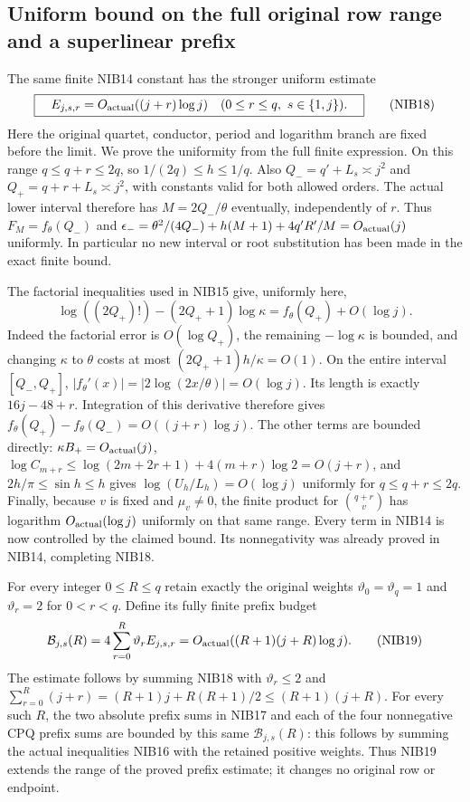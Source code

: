 \documentclass[11pt,a4paper]{article}
\begin{document}
\subsection{Uniform bound on the full original row range and a superlinear prefix}
The same finite NIB14 constant has the stronger uniform estimate
\[
 \boxed{\quad E_{j,s,r}=O_{\rm actual}((j+r)\log j)
    \quad(0\le r\le q,\ s\in\{1,j\}).\quad}               \tag{NIB18}
\]
Here the original quartet, conductor, period and logarithm branch
are fixed before the limit. We prove the uniformity from the full
finite expression. On this range $q\le q+r\le2q$, so
$1/(2q)\le h\le1/q$. Also $Q_-=q'+L_s\asymp j^2$ and
$Q_+=q+r+L_s\asymp j^2$, with constants valid for both allowed
orders. The actual lower interval therefore has
$M=2Q_-/\theta$ eventually, independently of $r$. Thus
$F_M=f_\theta(Q_-)$ and
$\epsilon_-=\theta^2/(4Q_-)+h(M+1)+4q'R'/M=O_{\rm actual}(j)$
uniformly. In particular no new interval or root substitution
has been made in the exact finite bound.

The factorial inequalities used in NIB15 give, uniformly here,
\[
 \log((2Q_+)!) -(2Q_++1)\log\kappa
       =f_\theta(Q_+)+O(\log j).
\]
Indeed the factorial error is $O(\log Q_+)$, the remaining
$-\log\kappa$ is bounded, and changing $\kappa$ to $\theta$
costs at most $(2Q_++1)h/\kappa=O(1)$. On the entire interval
$[Q_-,Q_+]$, $|f_\theta'(x)|=|2\log(2x/\theta)|=O(\log j)$.
Its length is exactly $16j-48+r$. Integration of this derivative
therefore gives
$f_\theta(Q_+)-f_\theta(Q_-)=O((j+r)\log j)$.
The other terms are bounded directly:
$\kappa B_+=O_{\rm actual}(j)$,
$\log C_{m+r}\le\log(2m+2r+1)+4(m+r)\log2=O(j+r)$,
and $2h/\pi\le\sin h\le h$ gives
$\log(U_h/L_h)=O(\log j)$ uniformly for $q\le q+r\le2q$.
Finally, because $v$ is fixed and $\mu_v\ne0$,
the finite product for $\binom{q+r}{v}$ has logarithm
$O_{\rm actual}(\log j)$ uniformly on that same range.
Every term in NIB14 is now controlled by the claimed bound.
Its nonnegativity was already proved in NIB14, completing NIB18.

For every integer $0\le R\le q$ retain exactly the original weights
$\vartheta_0=\vartheta_q=1$ and $\vartheta_r=2$ for $0<r<q$.
Define its fully finite prefix budget
\[
 \mathcal B_{j,s}(R)=4\sum_{r=0}^R\vartheta_rE_{j,s,r}
       =O_{\rm actual}((R+1)(j+R)\log j).
                                                               \tag{NIB19}
\]
The estimate follows by summing NIB18 with
$\vartheta_r\le2$ and
$\sum_{r=0}^R(j+r)=(R+1)j+R(R+1)/2\le(R+1)(j+R)$.
For every such $R$, the two absolute prefix sums in NIB17 and
each of the four nonnegative CPQ prefix sums are bounded by
this same $\mathcal B_{j,s}(R)$: this follows by summing the
actual inequalities NIB16 with the retained positive weights.
Thus NIB19 extends the range of the proved prefix estimate;
it changes no original row or endpoint.
\end{document}
